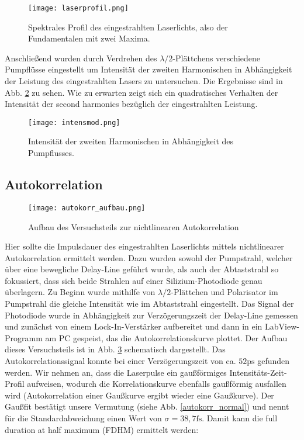 \begin{figure}[H]
	\begin{center}
		\texttt{[image: laserprofil.png]}
		\caption{Spektrales Profil des eingestrahlten Laserlichts, also der Fundamentalen mit zwei Maxima.}
		\label{laserprofil}
	\end{center}
\end{figure}

Anschließend wurden durch Verdrehen des $\lambda/2$-Plättchens verschiedene Pumpflüsse eingestellt um Intensität der zweiten Harmonischen in Abhängigkeit der Leistung des eingestrahlten Lasers zu untersuchen. Die Ergebnisse sind in Abb. \ref{intensitätmod} zu sehen. Wie zu erwarten zeigt sich ein quadratisches Verhalten der Intensität der second harmonics bezüglich der eingestrahlten Leistung.

\begin{figure}[H]
	\begin{center}
		\texttt{[image: intensmod.png]}
		\caption{Intensität der zweiten Harmonischen in Abhängigkeit des Pumpflusses.}
		\label{intensitätmod}
	\end{center}
\end{figure}


\subsection{Autokorrelation}
\begin{figure}[H]
	\begin{center}
		\texttt{[image: autokorr\_aufbau.png]}
		\caption{Aufbau des Versuchsteils zur nichtlinearen Autokorrelation}
		\label{autokorr_aufbau}
	\end{center}
\end{figure}

Hier sollte die Impulsdauer des eingestrahlten Laserlichts mittels nichtlinearer Autokorrelation ermittelt werden. Dazu wurden sowohl der Pumpstrahl, welcher über eine bewegliche Delay-Line geführt wurde, als auch der Abtaststrahl so fokussiert, dass sich beide Strahlen auf einer Silizium-Photodiode genau überlagern. Zu Beginn wurde mithilfe von $\lambda/2$-Plättchen und Polarisator im Pumpstrahl die gleiche Intensität wie im Abtaststrahl eingestellt. Das Signal der Photodiode wurde in Abhängigkeit zur Verzögerungszeit der Delay-Line gemessen und zunächst von einem Lock-In-Verstärker aufbereitet und dann in ein LabView-Programm am PC gespeist, das die Autokorrelationskurve plottet. Der Aufbau dieses Versuchsteils ist in Abb. \ref{autokorr_aufbau} schematisch dargestellt.
Das Autokorrelationssignal konnte bei einer Verzögerungszeit von ca. $52 \si{\pico\second}$ gefunden werden. Wir nehmen an, dass die Laserpulse ein gaußförmiges Intensitäts-Zeit-Profil aufweisen, wodurch die Korrelationskurve ebenfalls gaußförmig ausfallen wird (Autokorrelation einer Gaußkurve ergibt wieder eine Gaußkurve). Der Gaußfit bestätigt unsere Vermutung (siehe Abb. \ref{autokorr_normal}) und nennt für die Standardabweichung einen Wert von $\sigma=38,7\si{\femto\second}$. Damit kann die full duration at half maximum (FDHM) ermittelt werden:


